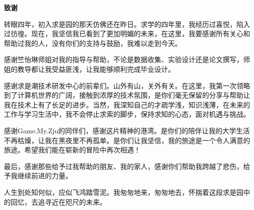 \cleardoublepage{}
\begin{center}
    \bfseries {} 致谢
\end{center}

\par 转眼四年，初入求是园的那天仿佛还在昨日。求学的四年里，我经历过喜悦，陷入过彷徨。现在，我坚信我已看到了更加明媚的未来，在这里，我要感谢所有关心和帮助过我的人，没有你们的支持与鼓励，我难以走到今天。

\par 感谢竺怡琳师姐对我的指导与帮助，不论是数据收集、实验设计还是论文撰写，师姐的教导都让我受益匪浅，让我能够顺利完成毕业设计。

\par 感谢求是潮技术研发中心的前辈们。山外有山，关外有关。在这里，我第一次领略到了计算机世界的广阔，接触到浓厚的技术氛围，是你们毫无保留的分享与帮助让我在技术上有了长足的进步。当然，我深知自己的才疏学浅，知识浅薄，在未来的工作与学习生活中，我不会停止求索的脚步，保持求知的心态，面对机遇与挑战。

\par 感谢Game.My.Zju的同伴们，感谢这片精神的港湾。是你们的陪伴让我的大学生活不再枯燥，让我在黑夜里不再孤单。是你们让我坚信，我的旅途是一个令人满意的旅途。希望我们能在崭新的冒险中再次相遇！

\par 最后，感谢那些给予过我帮助的朋友、我的家人，感谢你们帮助我跨越了悲伤，给予我继续前进的力量。

\par 人生到处知何似，应似飞鸿踏雪泥。我匆匆地来，匆匆地去，怀揣着这段求是园中的回忆，去追寻近在咫尺的未来。